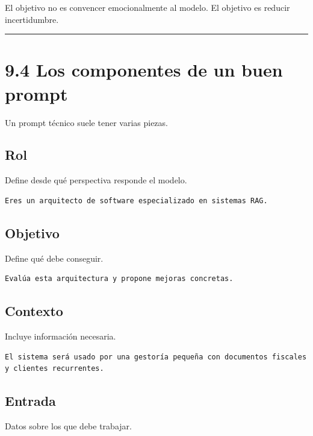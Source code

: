 El objetivo no es convencer emocionalmente al modelo. El objetivo es
reducir incertidumbre.

\begin{center}\rule{0.5\linewidth}{0.5pt}\end{center}

\section{9.4 Los componentes de un buen
prompt}\label{los-componentes-de-un-buen-prompt}

Un prompt técnico suele tener varias piezas.

\subsection{Rol}\label{rol}

Define desde qué perspectiva responde el modelo.

\begin{lstlisting}
Eres un arquitecto de software especializado en sistemas RAG.
\end{lstlisting}

\subsection{Objetivo}\label{objetivo}

Define qué debe conseguir.

\begin{lstlisting}
Evalúa esta arquitectura y propone mejoras concretas.
\end{lstlisting}

\subsection{Contexto}\label{contexto}

Incluye información necesaria.

\begin{lstlisting}
El sistema será usado por una gestoría pequeña con documentos fiscales y clientes recurrentes.
\end{lstlisting}

\subsection{Entrada}\label{entrada}

Datos sobre los que debe trabajar.

